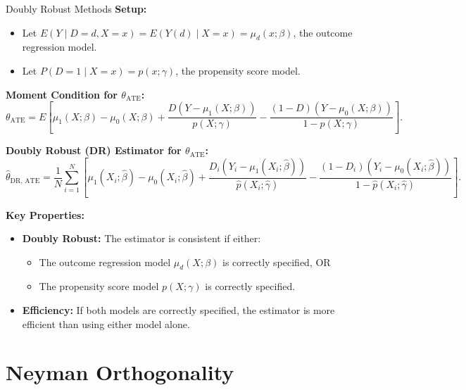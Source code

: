 \documentclass[xcolor=svgnames,t]{beamer}
\begin{document}
\begin{frame}{Doubly Robust Methods}
    \textbf{Setup:}
    \begin{itemize}
        \item Let \(E(Y \mid D=d, X=x) = E(Y(d) \mid X=x) = \mu_d(x; \beta)\), the outcome regression model.
        \item Let \(P(D=1 \mid X=x) = p(x; \gamma)\), the propensity score model.
    \end{itemize}
    
    \pause
    
    \textbf{Moment Condition for \(\theta_{\text{ATE}}\):}
    \scriptsize
    \[
    \theta_{\text{ATE}} = E \left[
    \mu_1(X; \beta) - \mu_0(X; \beta)
    + \frac{D(Y - \mu_1(X; \beta))}{p(X; \gamma)}
    - \frac{(1-D)(Y - \mu_0(X; \beta))}{1-p(X; \gamma)}
    \right].
    \]
    \normalsize
    
    \pause
    
    \textbf{Doubly Robust (DR) Estimator for \(\theta_{\text{ATE}}\):}
    \scriptsize
    \[
    \widehat{\theta}_{\text{DR, ATE}} = \frac{1}{N} \sum_{i=1}^N \left[
    \mu_1(X_i; \widehat{\beta}) - \mu_0(X_i; \widehat{\beta})
    + \frac{D_i(Y_i - \mu_1(X_i; \widehat{\beta}))}{\widehat{p}(X_i; \widehat{\gamma})}
    - \frac{(1-D_i)(Y_i - \mu_0(X_i; \widehat{\beta}))}{1-\widehat{p}(X_i; \widehat{\gamma})}
    \right].
    \]
    \normalsize
    
    \pause
    
    \textbf{Key Properties:}
    \begin{itemize}
        \item \textbf{Doubly Robust:} The estimator is consistent if either:
        \begin{itemize}
            \item The outcome regression model \(\mu_d(X; \beta)\) is correctly specified, OR
            \item The propensity score model \(p(X; \gamma)\) is correctly specified.
        \end{itemize}
        \pause
        \item \textbf{Efficiency:} If both models are correctly specified, the estimator is more efficient than using either model alone.
       
    \end{itemize}
    \end{frame}
    
    


\section{Neyman Orthogonality}
\end{document}
